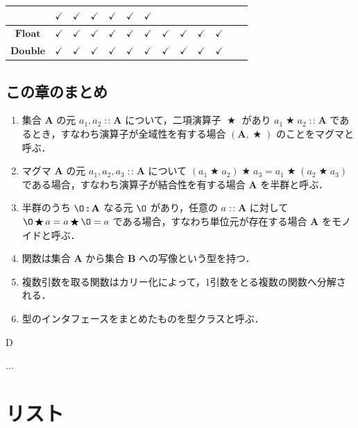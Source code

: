 \documentclass[a4paper,twocolumn]{jsbook}
\newenvironment{note}[1]{\begin{boxnote}\begin{center}#1\end{center}}{\end{boxnote}}
\newcommand{\mZero}{\O}
\DeclareMathOperator{\mBinOp}{\bigstar}
\DeclareMathOperator{\mIn}{{:\!:}}
\newcommand{\mSet}[1]{\mathbf{#1}}
\newcommand{\mType}[1]{\mathbf{#1}}
\newcommand{\mTupleWith}[1]{\left(#1\right)}
\newcommand{\mFloatType}{\mType{Float}}
\newcommand{\mDoubleType}{\mType{Double}}
\begin{document}
\begin{table}
\begin{center}
\begin{tabular}{||c||c|c|c|c|c|c|c|c|c|c|c|c||}
    &$\checkmark$
    &$\checkmark$
    &$\checkmark$
    &$\checkmark$
    &$\checkmark$
    &$\checkmark$\\
\hline
$\mFloatType$
    &$\checkmark$
    &$\checkmark$
    &$\checkmark$
    &$\checkmark$
    &$\checkmark$
    &$\checkmark$
    &$\checkmark$
    &$\checkmark$
    &$\checkmark$
    &$\checkmark$
    &
    &\\
\hline
$\mDoubleType$
    &$\checkmark$
    &$\checkmark$
    &$\checkmark$
    &$\checkmark$
    &$\checkmark$
    &$\checkmark$
    &$\checkmark$
    &$\checkmark$
    &$\checkmark$
    &$\checkmark$
    &
    &\\
\hline
\end{tabular}
\end{center}
\end{table}

\section{この章のまとめ}

\begin{enumerate}
\item 集合 $\mSet{A}$ の元 $a_1,a_2\mIn\mSet{A}$ について，二項演算子 $\mBinOp$ があり $a_1\mBinOp a_2\mIn\mSet{A}$ であるとき，すなわち演算子が全域性を有する場合 $\mTupleWith{\mSet{A},\mBinOp}$ のことをマグマと呼ぶ．
\item マグマ $\mSet{A}$ の元 $a_1,a_2,a_3\mIn\mSet{A}$ について $(a_1\mBinOp a_2)\mBinOp a_3=a_1\mBinOp(a_2\mBinOp a_3)$ である場合，すなわち演算子が結合性を有する場合 $\mSet{A}$ を半群と呼ぶ．
\item 半群のうち $\mZero\mIn\mSet{A}$ なる元 $\mZero$ があり，任意の $a\mIn\mSet{A}$ に対して $\mZero\mBinOp a=a\mBinOp\mZero=a$ である場合，すなわち単位元が存在する場合 $\mSet{A}$ をモノイドと呼ぶ．
\item 関数は集合 $\mSet{A}$ から集合 $\mSet{B}$ への写像という型を持つ． %
\item 複数引数を取る関数はカリー化によって，1引数をとる複数の関数へ分解される．
\item 型のインタフェースをまとめたものを型クラスと呼ぶ． %
\end{enumerate}

\begin{note}{D}
...
\end{note}



\chapter{リスト}
\label{ch:list}
\end{document}
